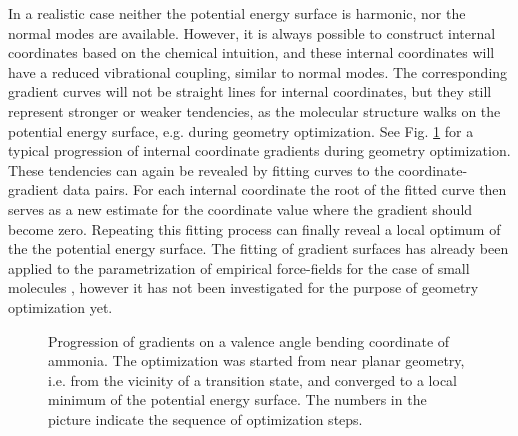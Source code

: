 \documentclass[prl,aps,twocolumn,showpacs,twocolumngrid,superbib]{revtex4}
\begin{document}
In a realistic case neither the potential energy surface is 
harmonic, nor the normal modes are available. However, it is always
possible to construct internal coordinates based on the chemical
intuition, and these internal coordinates will have a reduced
vibrational coupling, similar to normal modes. The corresponding
gradient curves will not be straight lines for internal coordinates,
but they still represent stronger or weaker tendencies, as the molecular
structure walks on the potential energy surface, e.g. during geometry
optimization.
See Fig. \ref{NH3outp6} for a typical progression of internal
coordinate gradients during geometry optimization.
These tendencies can again be revealed by fitting curves to the
coordinate-gradient data pairs. For each internal coordinate 
the root of the fitted curve then 
serves as a new estimate for the coordinate value where the gradient
should become zero. Repeating this fitting process can finally
reveal a local optimum of the the potential energy surface.
The fitting of gradient surfaces has already been applied to 
the parametrization of empirical
force-fields for the case of small molecules
\cite{force-field-fitting}, however it 
has not been investigated for the purpose of geometry optimization yet.
\begin{figure}[h]
\caption{
\small  
Progression of gradients on a valence angle bending coordinate of
ammonia. The optimization was started from near planar geometry, i.e.
from the vicinity of a transition state, and converged to a local 
minimum of the potential energy surface. The numbers in the picture
indicate the sequence of optimization steps.
\label{NH3outp6}
}
\end{figure}
\end{document}
